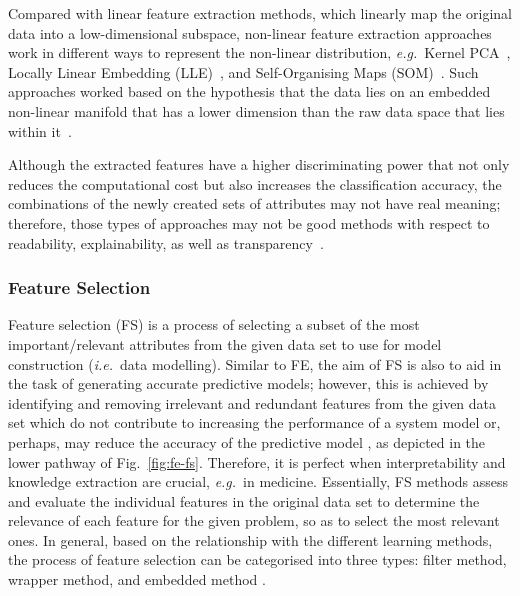 \documentclass{article}
\newcommand{\zzie}{\emph{i.e.}~}
\newcommand{\zzeg}{\emph{e.g.}~}
\newcommand*{\1}{\textcolor{magenta}}
\begin{document}
	Compared with linear feature extraction methods, which linearly map the original data into a low-dimensional subspace, non-linear feature extraction approaches work in different ways to represent the non-linear distribution, \zzeg Kernel PCA~\cite{aziz2017dimension}, Locally Linear Embedding (LLE)~\cite{aziz2017dimension}, and Self-Organising Maps (SOM)~\cite{li2019machine}. Such approaches worked based on the hypothesis that the data lies on an embedded non-linear manifold that has a lower dimension than the raw data space that lies within it~\cite{aziz2017dimension}. 
	
	Although the extracted features have a higher discriminating power that not only reduces the computational cost but also increases the classification accuracy, the combinations of the newly created sets of attributes may not have real meaning; therefore, those types of approaches may not be good methods with respect to readability, explainability, as well as transparency~\cite{remeseiro2019review}. 
	
	\subsubsection{Feature Selection}\label{sec:fs}
	Feature selection (FS) is a process of selecting a subset of the most important/relevant attributes from the given data set to use for model construction (\zzie data modelling). Similar to FE, the aim of FS is also to aid in the task of generating accurate predictive models; however, this is achieved by identifying and removing irrelevant and redundant features from the given data set which do not contribute to increasing the performance of a system model or, perhaps, may reduce the accuracy of the predictive model \cite{zuo2018grooming}, as depicted in the lower pathway of Fig.~\ref{fig:fe-fs}. Therefore, it is perfect when interpretability and knowledge extraction are crucial, \zzeg in medicine. Essentially, FS methods assess and evaluate the individual features in the original data set to determine the relevance of each feature for the given problem, so as to select the most relevant ones. In general, based on the relationship with the different learning methods, the process of feature selection can be categorised into three types: filter method, wrapper method, and embedded method \cite{liang2017text}. 
	
\end{document}
